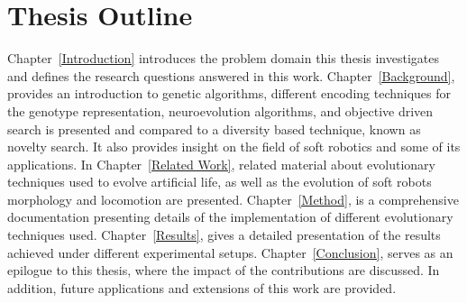 \section{Thesis Outline}
Chapter~\ref{Introduction} introduces the problem domain this thesis investigates and defines the research questions answered in this work.
Chapter~\ref{Background}, provides an introduction to genetic algorithms, different encoding techniques for the genotype representation, neuroevolution algorithms, and objective driven search is presented and compared to a diversity based technique, known as novelty search. It also provides insight on the field of soft robotics and some of its applications. In Chapter~\ref{Related Work}, related material about evolutionary techniques used to evolve artificial life, as well as the evolution of soft robots morphology and locomotion are presented. Chapter~\ref{Method}, is a comprehensive documentation presenting details of the implementation of different evolutionary techniques used. Chapter~\ref{Results}, gives a detailed presentation of the results achieved under different experimental setups. Chapter~\ref{Conclusion}, serves as an epilogue to this thesis, where the impact of the contributions are discussed. In addition, future applications and extensions of this work are provided.






